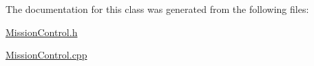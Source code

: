 The documentation for this class was generated from the following files\-:\begin{DoxyCompactItemize}
\item 
\hyperlink{a00033}{Mission\-Control.\-h}\item 
\hyperlink{a00032}{Mission\-Control.\-cpp}\end{DoxyCompactItemize}
